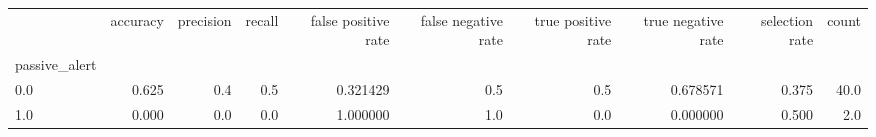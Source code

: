 \begin{tabular}{lrrrrrrrrr}
\toprule
{} &  accuracy &  precision &  recall &  false positive rate &  false negative rate &  true positive rate &  true negative rate &  selection rate &  count \\
passive\_alert &           &            &         &                      &                      &                     &                     &                 &        \\
\midrule
0.0           &     0.625 &        0.4 &     0.5 &             0.321429 &                  0.5 &                 0.5 &            0.678571 &           0.375 &   40.0 \\
1.0           &     0.000 &        0.0 &     0.0 &             1.000000 &                  1.0 &                 0.0 &            0.000000 &           0.500 &    2.0 \\
\bottomrule
\end{tabular}
